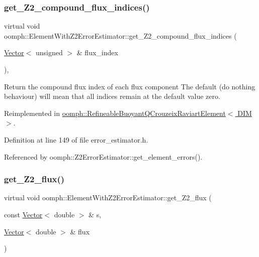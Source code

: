 \subsubsection{\texorpdfstring{get\+\_\+\+Z2\+\_\+compound\+\_\+flux\+\_\+indices()}{get\_Z2\_compound\_flux\_indices()}}
{\footnotesize\ttfamily virtual void oomph\+::\+Element\+With\+Z2\+Error\+Estimator\+::get\+\_\+\+Z2\+\_\+compound\+\_\+flux\+\_\+indices (\begin{DoxyParamCaption}\item[{\hyperlink{classoomph_1_1Vector}{Vector}$<$ unsigned $>$ \&}]{flux\+\_\+index }\end{DoxyParamCaption})\hspace{0.3cm}{\ttfamily [inline]}, {\ttfamily [virtual]}}



Return the compound flux index of each flux component The default (do nothing behaviour) will mean that all indices remain at the default value zero. 



Reimplemented in \hyperlink{classoomph_1_1RefineableBuoyantQCrouzeixRaviartElement_ac8b5c8d8df0dc6d7af67570c609f591b}{oomph\+::\+Refineable\+Buoyant\+Q\+Crouzeix\+Raviart\+Element$<$ D\+I\+M $>$}.



Definition at line 149 of file error\+\_\+estimator.\+h.



Referenced by oomph\+::\+Z2\+Error\+Estimator\+::get\+\_\+element\+\_\+errors().

\mbox{\label{classoomph_1_1ElementWithZ2ErrorEstimator_a5688ff5f546d81771cabad82ca5a7556}} 
\subsubsection{\texorpdfstring{get\+\_\+\+Z2\+\_\+flux()}{get\_Z2\_flux()}}
{\footnotesize\ttfamily virtual void oomph\+::\+Element\+With\+Z2\+Error\+Estimator\+::get\+\_\+\+Z2\+\_\+flux (\begin{DoxyParamCaption}\item[{const \hyperlink{classoomph_1_1Vector}{Vector}$<$ double $>$ \&}]{s,  }\item[{\hyperlink{classoomph_1_1Vector}{Vector}$<$ double $>$ \&}]{flux }\end{DoxyParamCaption})\hspace{0.3cm}{\ttfamily [pure virtual]}}



